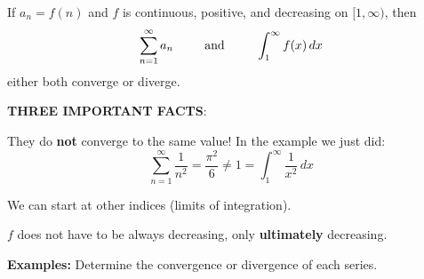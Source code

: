 \documentclass[addpoints, 12pt]{exam}
\begin{document}
\newpage

\begin{tcolorbox}[title= THE INTEGRAL TEST,black,sharp corners,colback=white,colbacktitle=white,coltitle=black]

    If $a_n=f(n)$ and $f$ is continuous, positive, and decreasing on $[1,\infty)$, then
    \[\sum_{n=1}^{\infty}a_n\hspace{.35in}\text{and}\hspace{.35in} \int_1^{\infty}f(x)\,dx\]
    either both converge or diverge.

\end{tcolorbox}
\vspace{.1in}

\noindent\textbf{THREE IMPORTANT FACTS}:
\begin{questions}
    \question They do \textbf{not} converge to the same value! In the example we just did:
    \[\displaystyle\sum_{n=1}^\infty \frac{1}{n^2}=\frac{\pi^2}{6}\ne1=\int_1^\infty\frac{1}{x^2}\,dx\]
    
    \question We can start at other indices (limits of integration).
    
    \question $f$ does not have to be always decreasing, only \textbf{ultimately} decreasing.
\end{questions}
\vspace{.1in}

\noindent\textbf{Examples:} Determine the convergence or divergence of each series.
\end{document}
